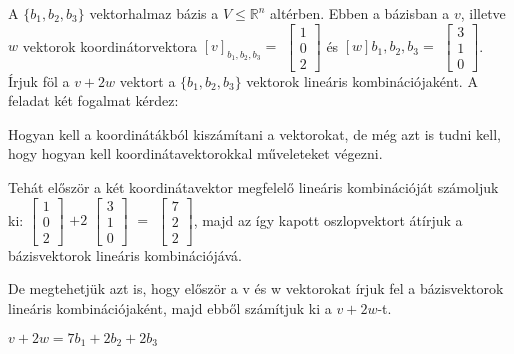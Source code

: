 \begin{frame}
  \begin{tcolorbox}[title={1/3. {\symrook}}]
      A $\{b_1,b_2,b_3\}$ vektorhalmaz bázis a $V \leq \mathbb{R}^n$ altérben. Ebben a bázisban a $v$, illetve $w$ vektorok koordinátorvektora $[v]_{b_1,b_2,b_3} = $ $\begin{bmatrix} 
  				1  \\
  				0 \\
  				2
			\end{bmatrix}$ és $[w]{b_1,b_2,b_3} = $ $\begin{bmatrix} 
  				3  \\
  				1 \\
  				0
			\end{bmatrix}$. Írjuk föl a $v+2w$ vektort a $\{b_1,b_2,b_3\}$ vektorok lineáris kombinációjaként.
  \tcblower
    A feladat két fogalmat kérdez:\\
    \mmedskip
    
    Hogyan kell a koordinátákból kiszámítani a vektorokat, de még azt is tudni kell, hogy hogyan kell koordinátavektorokkal műveleteket végezni.\\
    \mmedskip
      
    Tehát először a két koordinátavektor megfelelő lineáris kombinációját számoljuk ki: $\begin{bmatrix} 
  				1  \\
  				0 \\
  				2
			\end{bmatrix}$ $+ 2$ $\begin{bmatrix} 
  				3  \\
  				1 \\
  				0
			\end{bmatrix}$ $=$ $\begin{bmatrix} 
  				7  \\
  				2 \\
  				2
			\end{bmatrix}$, majd az így kapott oszlopvektort átírjuk a bázisvektorok lineáris kombinációjává.\\
			\mmedskip
      
      De megtehetjük azt is, hogy először a v és w vektorokat írjuk fel a bázisvektorok lineáris kombinációjaként, majd ebből számítjuk ki a $v+2w$-t.\\
      \mmedskip
      
      $v + 2w = 7b_1 + 2b_2 + 2b_3$
  \end{tcolorbox}
\end{frame}
  
